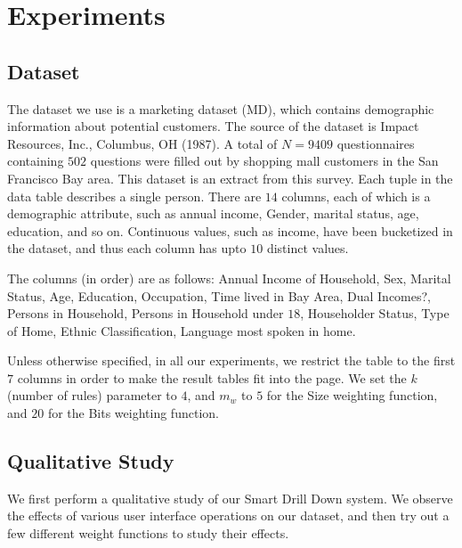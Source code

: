 
\section{Experiments}\label{sec:experiments}

\subsection{Dataset}
The dataset we use is a marketing dataset (MD), which contains demographic information about potential customers. The source of the dataset is Impact Resources, Inc., Columbus, OH (1987). A total of $N=9409$ questionnaires containing $502$ questions were 
filled out by shopping mall customers in the San Francisco Bay area. This dataset is an extract from this survey. Each tuple in the data table describes a single person. There are $14$ columns, each of which is a demographic attribute, such as annual income, Gender, marital status, age, education, and so on. Continuous values, such as income, have been bucketized in the dataset, and thus each column has upto $10$ distinct values. 

The columns (in order) are as follows:
Annual Income of Household, Sex, Marital Status, Age, Education, Occupation, Time lived in Bay Area, Dual Incomes?, Persons in Household, Persons in Household under $18$, Householder Status, Type of Home, Ethnic Classification, Language most spoken in home.

Unless otherwise specified, in all our experiments, we restrict the table to the first $7$ columns in order to make the result tables fit into the page. We set the $k$ (number of rules) parameter to $4$, and $m_w$ to $5$ for the Size weighting function, and $20$ for the Bits weighting function. 

\subsection{Qualitative Study}
We first perform a qualitative study of our Smart Drill Down system. We observe the effects of various user interface operations on our dataset, and then try out a few different weight functions to study their effects.
